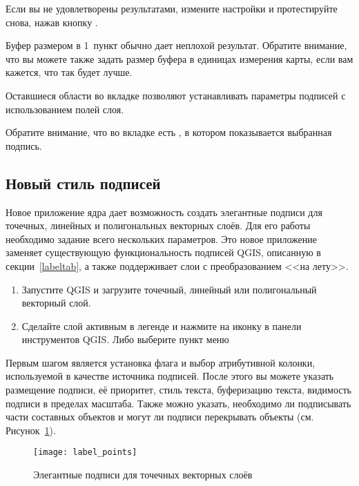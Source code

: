 Если вы не удовлетворены результатами, измените настройки и протестируйте
снова, нажав кнопку .

Буфер размером в 1~пункт обычно дает неплохой результат. Обратите внимание,
что вы можете также задать размер буфера в единицах измерения карты, если
вам кажется, что так будет лучше.

Оставшиеся области во вкладке  позволяют устанавливать
параметры подписей с использованием полей слоя.

Обратите внимание, что во вкладке  есть ,
в котором показывается выбранная подпись.

\subsection{Новый стиль подписей}\label{newlabel}

Новое приложение ядра \qg {} дает возможность
создать элегантные подписи для точечных, линейных и полигональных векторных
слоёв. Для его работы необходимо задание всего нескольких параметров.
Это новое приложение заменяет существующую функциональность подписей QGIS,
описанную в секции~\ref{labeltab}, а также поддерживает слои с преобразованием
<<на лету>>.


\begin{enumerate}
  \item Запустите QGIS и загрузите точечный, линейный или полигональный
  векторный слой.
  \item Сделайте слой активным в легенде и нажмите на иконку
   в панели инструментов QGIS. Либо выберите
пункт меню  \arrow {}
\end{enumerate}


Первым шагом является установка флага 
и выбор атрибутивной колонки, используемой в качестве источника подписей.
После этого вы можете указать размещение подписи, её приоритет, стиль
текста, буферизацию текста, видимость подписи в пределах масштаба. Также
можно указать, необходимо ли подписывать части составных объектов и могут
ли подписи перекрывать объекты (см. Рисунок~\ref{fig:pointlabel}).

\begin{figure}[ht]
\centering
   \texttt{[image: label\_points]}
   \caption{Элегантные подписи для точечных векторных слоёв \wincaption}\label{fig:pointlabel}
\end{figure}

